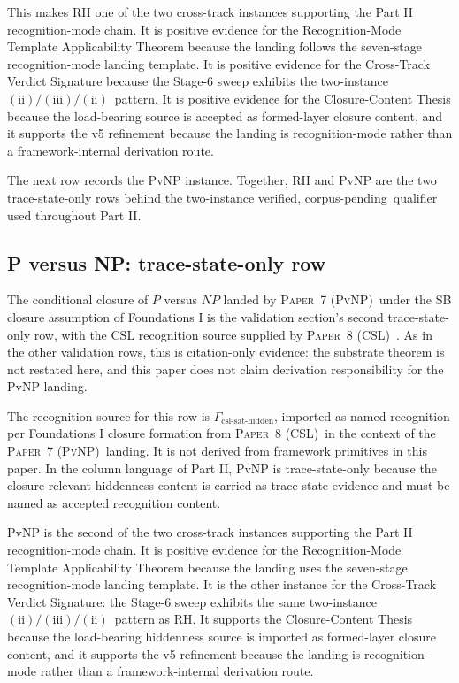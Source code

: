 \documentclass[11pt]{article}
\newcommand{\PaperPvNP}{\textsc{Paper~7 (PvNP)}}
\newcommand{\PaperCSL}{\textsc{Paper~8 (CSL)}}
\newcommand{\SevenStage}{seven-stage recognition-mode landing template}
\newcommand{\SigPattern}{$\mathrm{(ii)}/\mathrm{(iii)}/\mathrm{(ii)}$}
\newcommand{\TwoInstance}{two-instance verified, corpus-pending}
\theoremstyle{definition}
\begin{document}
This makes RH one of the two cross-track instances supporting the Part II
recognition-mode chain. It is positive evidence for the
Recognition-Mode Template Applicability Theorem because the landing
follows the \SevenStage. It is positive evidence for the Cross-Track
Verdict Signature because the Stage-6 sweep exhibits the two-instance
\SigPattern\ pattern. It is positive evidence for the Closure-Content
Thesis because the load-bearing source is accepted as formed-layer
closure content, and it supports the v5 refinement because the landing is
recognition-mode rather than a framework-internal derivation route.

The next row records the PvNP instance. Together, RH and PvNP are the two
trace-state-only rows behind the \TwoInstance\ qualifier used throughout
Part II.

\subsection{P versus NP: trace-state-only row}\label{sec:validation:pvnp}

The conditional closure of \(P\) versus \(NP\) landed by \PaperPvNP\
under the SB closure assumption of Foundations I is the validation
section's second trace-state-only row, with the CSL recognition source
supplied by \PaperCSL\ \cite{Tsiokos2026PvNP,Tsiokos2026CSL}. As in the
other validation rows, this is citation-only evidence: the substrate
theorem is not restated here, and this paper does not claim derivation
responsibility for the PvNP landing.

The recognition source for this row is
\(\Gamma_{\text{csl-sat-hidden}}\), imported as named recognition per
Foundations I closure formation from \PaperCSL\ in the context of the
\PaperPvNP\ landing. It is not derived from framework primitives in this
paper. In the column language of Part II, PvNP is trace-state-only because
the closure-relevant hiddenness content is carried as trace-state evidence
and must be named as accepted recognition content.

PvNP is the second of the two cross-track instances supporting the Part II
recognition-mode chain. It is positive evidence for the
Recognition-Mode Template Applicability Theorem because the landing uses
the \SevenStage. It is the other instance for the Cross-Track Verdict
Signature: the Stage-6 sweep exhibits the same two-instance
\SigPattern\ pattern as RH. It supports the Closure-Content Thesis
because the load-bearing hiddenness source is imported as formed-layer
closure content, and it supports the v5 refinement because the landing is
recognition-mode rather than a framework-internal derivation route.
\end{document}
